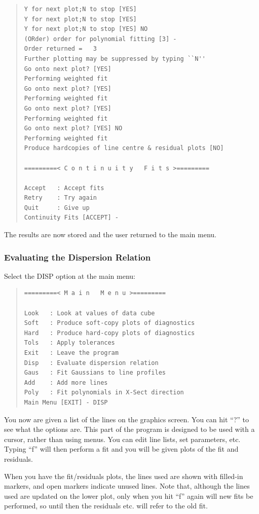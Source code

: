 \begin{quote}\begin{verbatim}
Y for next plot;N to stop [YES]
Y for next plot;N to stop [YES]
Y for next plot;N to stop [YES] NO
(ORder) order for polynomial fitting [3] -
Order returned =   3
Further plotting may be suppressed by typing ``N''
Go onto next plot? [YES]
Performing weighted fit
Go onto next plot? [YES]
Performing weighted fit
Go onto next plot? [YES]
Performing weighted fit
Go onto next plot? [YES] NO
Performing weighted fit
Produce hardcopies of line centre & residual plots [NO]
 
=========< C o n t i n u i t y   F i t s >=========
 
Accept   : Accept fits
Retry    : Try again
Quit     : Give up
Continuity Fits [ACCEPT] -
\end{verbatim}\end{quote}

The results are now stored and the user returned to the main menu.

\subsubsection{%
Evaluating the Dispersion Relation}

Select the DISP option at the main menu:
 
\begin{quote}\begin{verbatim}
=========< M a i n   M e n u >=========
 
Look   : Look at values of data cube
Soft   : Produce soft-copy plots of diagnostics
Hard   : Produce hard-copy plots of diagnostics
Tols   : Apply tolerances
Exit   : Leave the program
Disp   : Evaluate dispersion relation
Gaus   : Fit Gaussians to line profiles
Add    : Add more lines
Poly   : Fit polynomials in X-Sect direction
Main Menu [EXIT] - DISP
\end{verbatim}\end{quote}

You now are given a list of the lines on the graphics screen. You can
hit ``?'' to see what the options are. This part of the program is
designed to be used with a cursor, rather than using menus. You can
edit line lists, set parameters, etc. Typing ``f'' will then perform a
fit and you will be given plots of the fit and residuals.

When you have the fit/residuals plots, the lines used are shown with
filled-in markers, and open markers indicate unused lines. Note that,
although the lines used are updated on the lower plot, only when you
hit ``f'' again will new fits be performed, so until then the
residuals etc. will refer to the old fit.

